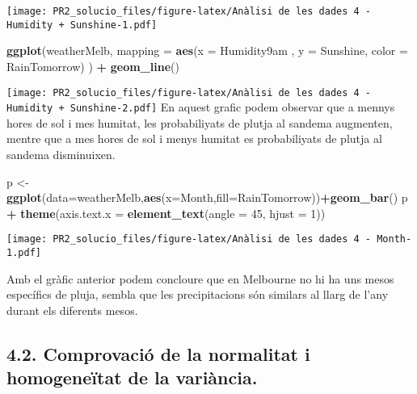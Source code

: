 \documentclass[
]{article}
\newenvironment{Shaded}{\begin{snugshade}}{\end{snugshade}}
\newcommand{\DataTypeTok}[1]{\textcolor[rgb]{0.13,0.29,0.53}{#1}}
\newcommand{\DecValTok}[1]{\textcolor[rgb]{0.00,0.00,0.81}{#1}}
\newcommand{\KeywordTok}[1]{\textcolor[rgb]{0.13,0.29,0.53}{\textbf{#1}}}
\newcommand{\NormalTok}[1]{#1}
\newcommand{\OperatorTok}[1]{\textcolor[rgb]{0.81,0.36,0.00}{\textbf{#1}}}
\newcommand{\StringTok}[1]{\textcolor[rgb]{0.31,0.60,0.02}{#1}}
\begin{document}
\texttt{[image: PR2\_solucio\_files/figure-latex/Anàlisi de les dades 4 - Humidity + Sunshine-1.pdf]}

\begin{Shaded}
\begin{Highlighting}[]
\KeywordTok{ggplot}\NormalTok{(weatherMelb, }\DataTypeTok{mapping =} \KeywordTok{aes}\NormalTok{(}\DataTypeTok{x =}\NormalTok{ Humidity9am , }\DataTypeTok{y =}\NormalTok{ Sunshine, }\DataTypeTok{color =}\NormalTok{ RainTomorrow) ) }\OperatorTok{+}\StringTok{ }\KeywordTok{geom_line}\NormalTok{()}
\end{Highlighting}
\end{Shaded}

\texttt{[image: PR2\_solucio\_files/figure-latex/Anàlisi de les dades 4 - Humidity + Sunshine-2.pdf]}
En aquest grafic podem observar que a mennys hores de sol i mes humitat,
les probabiliyats de plutja al sandema augmenten, mentre que a mes hores
de sol i menys humitat es probabiliyats de plutja al sandema
disminuixen.

\begin{Shaded}
\begin{Highlighting}[]
\NormalTok{p <-}\StringTok{ }\KeywordTok{ggplot}\NormalTok{(}\DataTypeTok{data=}\NormalTok{weatherMelb,}\KeywordTok{aes}\NormalTok{(}\DataTypeTok{x=}\NormalTok{Month,}\DataTypeTok{fill=}\NormalTok{RainTomorrow))}\OperatorTok{+}\KeywordTok{geom_bar}\NormalTok{()}
\NormalTok{p }\OperatorTok{+}\StringTok{ }\KeywordTok{theme}\NormalTok{(}\DataTypeTok{axis.text.x =} \KeywordTok{element_text}\NormalTok{(}\DataTypeTok{angle =} \DecValTok{45}\NormalTok{, }\DataTypeTok{hjust =} \DecValTok{1}\NormalTok{))}
\end{Highlighting}
\end{Shaded}

\texttt{[image: PR2\_solucio\_files/figure-latex/Anàlisi de les dades 4 - Month-1.pdf]}

Amb el gràfic anterior podem concloure que en Melbourne no hi ha uns
mesos específics de pluja, sembla que les precipitacions són similars al
llarg de l'any durant els diferents mesos.

\hypertarget{comprovaciuxf3-de-la-normalitat-i-homogeneuxeftat-de-la-variuxe0ncia.}{%
\subsection{4.2. Comprovació de la normalitat i homogeneïtat de la
variància.}\label{comprovaciuxf3-de-la-normalitat-i-homogeneuxeftat-de-la-variuxe0ncia.}}
\end{document}
